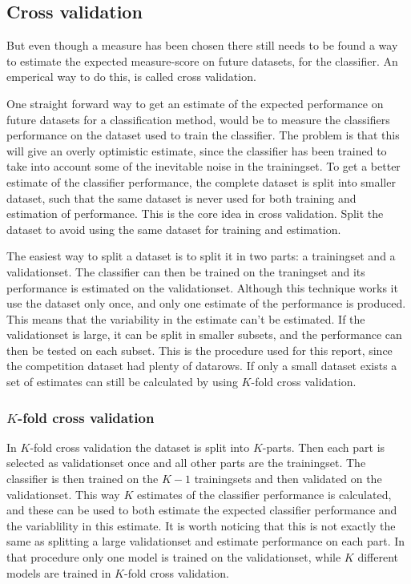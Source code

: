\subsection{Cross validation}
But even though a measure has been chosen there still needs to be found a way to estimate the expected measure-score on future datasets, for the classifier. An emperical way to do this, is called cross validation. \par
One straight forward way to get an estimate of the expected performance on future datasets for a classification method, would be to measure the classifiers performance on the dataset used to train the classifier. The problem is that this will give an overly optimistic estimate, since the classifier has been trained to take into account some of the inevitable noise in the trainingset. To get a better estimate of the classifier performance, the complete dataset is split into smaller dataset, such that the same dataset is never used for both training and estimation of performance. This is the core idea in cross validation. Split the dataset to avoid using the same dataset for training and estimation. \par
The easiest way to split a dataset is to split it in two parts: a trainingset and a validationset. The classifier can then be trained on the traningset and its performance is estimated on the validationset. Although this technique works it use the dataset only once, and only one estimate of the performance is produced. This means that the variability in the estimate can't be estimated. If the validationset is large, it can be split in smaller subsets, and the performance can then be tested on each subset. This is the procedure used for this report, since the competition dataset had plenty of datarows. If only a small dataset exists a set of estimates can still be calculated by using $K$-fold cross validation. 

\subsubsection{$K$-fold cross validation}
In $K$-fold cross validation the dataset is split into $K$-parts. Then each part is selected as validationset once and all other parts are the trainingset. The classifier is then trained on the $K-1$ trainingsets and then validated on the validationset. This way $K$ estimates of the classifier performance is calculated, and these can be used to both estimate the expected classifier performance and the variablility in this estimate. It is worth noticing that this is not exactly the same as splitting a large validationset and estimate performance on each part. In that procedure only one model is trained on the validationset, while $K$ different models are trained in $K$-fold cross validation.

